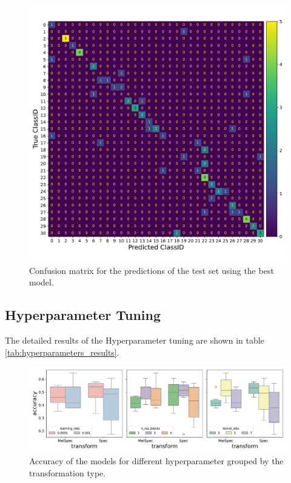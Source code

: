 \begin{figure}[h!]
    \centering
    \captionsetup{width=.7\linewidth}
    \includegraphics[width=1\textwidth]{figures/confusion_matrix_best.pdf}
    \caption{Confusion matrix for the predictions of the test set using the best model.}
    \label{fig:confusion_matrix_best}
\end{figure}

\subsection{Hyperparameter Tuning}%

The detailed results of the Hyperparameter tuning are shown in table \ref{tab:hyperparameters_results}.

\begin{figure}[h!]
    \centering
    \captionsetup{width=.7\linewidth}
    \includegraphics[width=1\textwidth]{figures/hyperparameters_boxplot.pdf}
    \caption{Accuracy of the models for different hyperparameter grouped by the transformation type.}
    \label{fig:hyperparameters_boxplot}
\end{figure}


